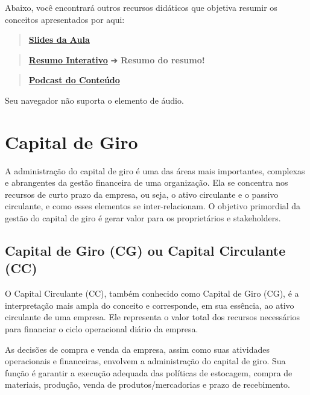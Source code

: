 \documentclass[
  a4paper,
]{book}
\begin{document}
Abaixo, você encontrará outros recursos didáticos que objetiva resumir
os conceitos apresentados por aqui:

\begin{quote}
\href{./resources/intro-ppt.html}{\textbf{Slides da Aula}}
\end{quote}

\begin{quote}
\href{./resources/intro-interativo.html}{\textbf{Resumo Interativo}} ➔
\textbf{Resumo do resumo!} 🥱
\end{quote}

\begin{quote}
\href{resources/intro-podcast.mp3}{\textbf{Podcast do Conteúdo}}
\end{quote}

Seu navegador não suporta o elemento de áudio.


\chapter{Capital de Giro}\label{sec-giro}

A administração do capital de giro é uma das áreas mais importantes,
complexas e abrangentes da gestão financeira de uma organização. Ela se
concentra nos recursos de curto prazo da empresa, ou seja, o ativo
circulante e o passivo circulante, e como esses elementos se
inter-relacionam. O objetivo primordial da gestão do capital de giro é
gerar valor para os proprietários e stakeholders.

\section{Capital de Giro (CG) ou Capital Circulante
(CC)}\label{capital-de-giro-cg-ou-capital-circulante-cc}

O Capital Circulante (CC), também conhecido como Capital de Giro (CG), é
a interpretação mais ampla do conceito e corresponde, em sua essência,
ao ativo circulante de uma empresa. Ele representa o valor total dos
recursos necessários para financiar o ciclo operacional diário da
empresa.

As decisões de compra e venda da empresa, assim como suas atividades
operacionais e financeiras, envolvem a administração do capital de giro.
Sua função é garantir a execução adequada das políticas de estocagem,
compra de materiais, produção, venda de produtos/mercadorias e prazo de
recebimento.
\end{document}
